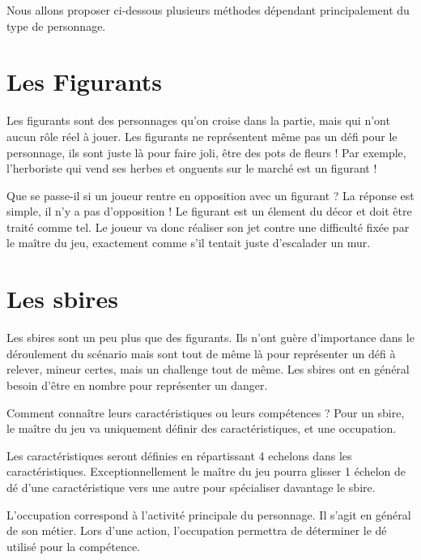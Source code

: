\documentclass{conf/FusinaClass}
\begin{document}
Nous allons proposer ci-dessous plusieurs méthodes dépendant principalement du type de personnage.

\section{Les Figurants}
Les figurants sont des personnages qu'on croise dans la partie, mais qui n'ont aucun rôle réel à jouer. Les figurants ne représentent même pas un défi pour le personnage, ils sont juste là pour faire joli, être des pots de fleurs ! Par exemple, l'herboriste qui vend ses herbes et onguents sur le marché est un figurant !

Que se passe-il si un joueur rentre en opposition avec un figurant ? La réponse est simple, il n'y a pas d'opposition ! Le figurant est un élement du décor et doit être traité comme tel. Le joueur va donc réaliser son jet contre une difficulté fixée par le maître du jeu, exactement comme s'il tentait juste d'escalader un mur.

\section{Les sbires}
Les sbires sont un peu plus que des figurants. Ils n'ont guère d'importance dans le déroulement du scénario mais sont tout de même là pour représenter un défi à relever, mineur certes, mais un challenge tout de même. Les sbires ont en général besoin d'être en nombre pour représenter un danger.

Comment connaître leurs caractéristiques ou leurs compétences ? Pour un sbire, le maître du jeu va uniquement définir des caractéristiques, et une occupation. 

Les caractéristiques seront définies en répartissant 4 echelons dans les caractéristiques. Exceptionnellement le maître du jeu pourra glisser 1 échelon de dé d'une caractéristique vers une autre pour spécialiser davantage le sbire. 

L'occupation correspond à l'activité principale du personnage. Il s'agit en général de son métier. Lors d'une action, l'occupation permettra de déterminer le dé utilisé pour la compétence. 
\end{document}
